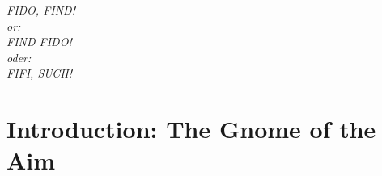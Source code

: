 \documentclass{article}
\begin{document}
\maketitle

\begin{flushright}\small\it FIDO, FIND!\\or:\\FIND FIDO!\\oder:\\FIFI, 
                            SUCH!\end{flushright} 
\begin{abstract}\noindent\hspace{1sp}%
'fifinddo' starts implementing parsing of plain text or \TeX\ files 
using \TeX, generalizing the philosophy behind 'docstrip', 
based on how \TeX\ reads macro arguments. 
Rather than typsetting the edited input stream immediately, 
results are written to another file, 
in the first instance as input for \TeX.
Rather than presenting a ``complete study" of a computer-scientific 
idea, it aims at practical applications. 
The main one at present is '\mbox{makedoc}' which removes certain comment 
marks from package files and inserts listing commands. 
Parsing macros are not defined anew at every input chunk, 
but once before a file is processed. 
This also allows for \emph{expandable} sequences of replacements, 
e.g., with `txt'$\to$\TeX\ functionality. 
The method of testing for substrings is carefully discussed,
revealing an earlier mistake (then) shared with 'substr.sty' 
and \LaTeX's internal `\in@'. 
\end{abstract}
\tableofcontents

\section{Introduction: The Gnome of the Aim} 
\end{document}
